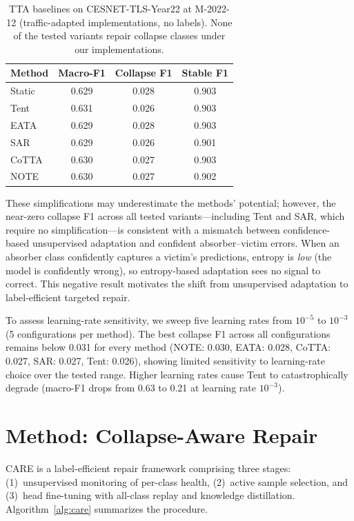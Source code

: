 \documentclass[preprint,12pt,authoryear]{elsarticle}
\newcommand{\ours}{CARE}  %
\begin{document}
\begin{table}[!htbp]
\centering
\caption{TTA baselines on CESNET-TLS-Year22 at M-2022-12 (traffic-adapted implementations, no labels). None of the tested variants repair collapse classes under our implementations.}
\label{tab:tta}
\small
\begin{tabular}{@{}l ccc@{}}
\toprule
Method & Macro-F1 & Collapse F1 & Stable F1 \\
\midrule
Static      & 0.629 & 0.028 & 0.903 \\
Tent        & 0.631 & 0.026 & 0.903 \\
EATA        & 0.629 & 0.028 & 0.903 \\
SAR         & 0.629 & 0.026 & 0.901 \\
CoTTA       & 0.630 & 0.027 & 0.903 \\
NOTE        & 0.630 & 0.027 & 0.902 \\
\bottomrule
\end{tabular}
\end{table}

These simplifications may underestimate the methods' potential; however, the near-zero collapse F1 across all tested variants---including Tent and SAR, which require no simplification---is consistent with a mismatch between confidence-based unsupervised adaptation and confident absorber--victim errors.
When an absorber class confidently captures a victim's predictions, entropy is \textit{low} (the model is confidently wrong), so entropy-based adaptation sees no signal to correct.
This negative result motivates the shift from unsupervised adaptation to label-efficient targeted repair.

To assess learning-rate sensitivity, we sweep five learning rates from $10^{-5}$ to $10^{-3}$ (5 configurations per method).
The best collapse F1 across all configurations remains below 0.031 for every method (NOTE: 0.030, EATA: 0.028, CoTTA: 0.027, SAR: 0.027, Tent: 0.026), showing limited sensitivity to learning-rate choice over the tested range.
Higher learning rates cause Tent to catastrophically degrade (macro-F1 drops from 0.63 to 0.21 at learning rate $10^{-3}$).

\section{Method: Collapse-Aware Repair}
\label{sec:method}

\ours{} is a label-efficient repair framework comprising three stages: (1)~unsupervised monitoring of per-class health, (2)~active sample selection, and (3)~head fine-tuning with all-class replay and knowledge distillation.
Algorithm~\ref{alg:care} summarizes the procedure.
\end{document}
